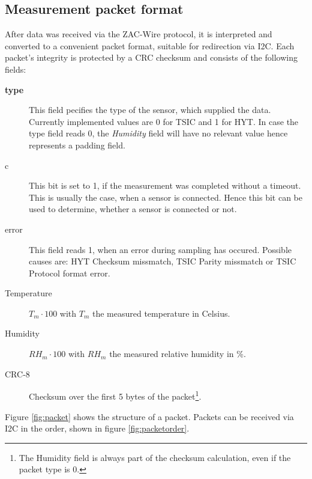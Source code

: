 \documentclass[a4paper]{scrreprt}
\begin{document}
\subsection{Measurement packet format}\label{chap:packet}
After data was received via the ZAC-Wire protocol, it is interpreted and converted to a convenient packet format, suitable for
redirection via I2C. Each packet's integrity is protected by a CRC checksum and consists of the following fields:\\
\begin{description}
	\item[\textbf{type}] This field pecifies the type of the sensor, which supplied the data. Currently implemented values are 0
		for TSIC and 1 for HYT. In case the type field reads 0, the \emph{Humidity} field will have no relevant value hence
		represents a padding field.
	\item[c] This bit is set to 1, if the measurement was completed without a timeout. This is usually the case, when a
		sensor is connected. Hence this bit can be used to determine, whether a sensor is connected or not.
	\item[error] This field reads 1, when an error during sampling has occured. Possible causes are: HYT Checksum missmatch,
		TSIC Parity missmatch or TSIC Protocol format error.
	\item[Temperature] $T_m \cdot 100$ with $T_m$ the measured temperature in Celsius.
	\item[Humidity] $RH_m \cdot 100$ with $RH_m$ the measured relative humidity in \%.
	\item[CRC-8] Checksum over the first 5 bytes of the packet\footnote{The Humidity field is always part of the checksum
		calculation, even if the packet type is 0.}.
\end{description}
Figure \ref{fig:packet} shows the structure of a packet. Packets can be received via I2C in the order, shown in
figure \ref{fig:packetorder}.\\
\end{document}
